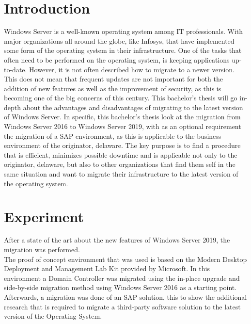 \documentclass[a0,portrait]{a0poster}
\begin{document}
\begin{multicols}{2}
\section*{Introduction}
\color{black}
\color{black}
Windows Server is a well-known operating system among IT professionals. With major organizations all around the globe, like Infosys, that have implemented some form of the operating system in their infrastructure.
One of the tasks that often need to be performed on the operating system, is keeping applications up-to-date. 
However, it is not often described how to migrate to a newer version.  
This does not mean that frequent updates are not important for both the addition of new features as well as the improvement of security, as this is becoming one of the big concerns of this century. 
This bachelor's thesis will go in-depth about the advantages and disadvantages of migrating to the latest version of Windows Server.
In specific, this bachelor's thesis look at the migration from Windows Server 2016 to Windows Server 2019, with as an optional requirement the migration of a SAP environment, as this is applicable to the business environment of the originator, delaware.
The key purpose is to find a procedure that is efficient, minimizes possible downtime and is applicable not only to the originator, delaware, but also to other organizations that find them self in the same situation and want to migrate their infrastructure to the latest version of the operating system.

\color{Black} %
\color{HoGentAccent1} 
\section*{Experiment}
\color{black}
After a state of the art about the new features of Windows Server 2019, the migration was performed. \\
The proof of concept environment that was used is based on the Modern Desktop Deployment and Management Lab Kit provided by Microsoft. 
In this environment a Domain Controller was migrated using the in-place upgrade and side-by-side migration method using Windows Server 2016 as a starting point.\\
Afterwards, a migration was done of an SAP solution, this to show the additional research that is required to migrate a third-party software solution to the latest version of the Operating System. 


\end{multicols}
\end{document}
